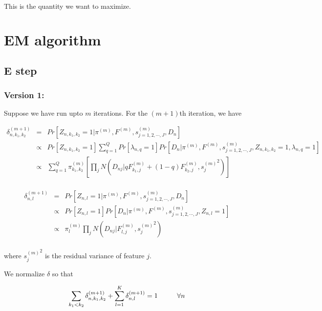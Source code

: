 \documentclass[11pt,authoryear]{article}
\begin{document}
This is the quantity we want to maximize. 

\section{EM algorithm}
\subsection{E step}
\subsubsection{Version 1: }

Suppose we have run upto $m$ iterations. For the $(m+1)$th iteration, we have 

\begin{eqnarray} \nonumber
\delta^{(m+1)}_{n, k_1, k_2} &=& Pr \left [ Z_{n, k_1, k_2} = 1 | \pi^{(m)}, F^{(m)}, s^{(m)}_{j=1,2,\cdots,J}, D_{n} \right ] \\ \nonumber
 &\propto& Pr \left [ Z_{n, k_1, k_2} = 1 \right] \sum_{q=1}^{Q} Pr \left [ \lambda_{n,q} = 1 \right] Pr \left [ D_{n} | \pi^{(m)}, F^{(m)}, s^{(m)}_{j=1,2,\cdots,J}, Z_{n, k_1, k_2}= 1, \lambda_{n, q}=1 \right] \\ \nonumber
 &\propto& \sum_{q=1}^{Q} \pi^{(m)}_{k_1,k_2} \left [ \prod_{j} N \left (D_{nj} | qF^{(m)}_{k_1,j} + (1-q)F^{(m)}_{k_2,j}, {s_j^{(m)}}^2 \right) \right ] \\ \nonumber
\end{eqnarray}

\begin{eqnarray} \nonumber
\delta^{(m+1)}_{n, l}  &=& Pr \left [ Z_{n, l} = 1  |  \pi^{(m)}, F^{(m)}, s^{(m)}_{j=1,2,\cdots,J}, D_{n} \right ] \\ \nonumber 
& \propto & Pr \left [ Z_{n, l} = 1 \right] Pr \left [ D_{n} | \pi^{(m)}, F^{(m)}, s^{(m)}_{j=1,2,\cdots,J}, Z_{n, l}= 1 \right] \\ \nonumber
& \propto & \pi^{(m)}_{l}  \prod_{j} N \left (D_{nj} | F^{(m)}_{l,j} , {s_j^{(m)}}^2 \right) \\  \nonumber
\end{eqnarray}


where ${s_j^{(m)}}^2$ is the residual variance of feature $j$.

We normalize $\delta$ so that 

$$ \sum_{k_1 < k_2} \delta^{(m+1)}_{n, k_1, k_2}  + \sum_{l=1}^{K} \delta^{(m+1)}_{n, l}= 1 \hspace{1 cm} \forall n $$
\end{document}
